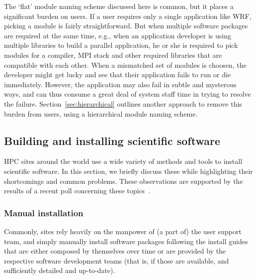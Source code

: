 The `flat' module naming scheme discussed here is common, but it places a significant
burden on users. If a user requires only a single application like WRF, picking a
module is fairly straightforward. But when multiple software packages are required
at the same time, e.g., when an application developer is using multiple libraries to
build a parallel application, he or she is required to pick modules for a
compiler, MPI stack and other required libraries that are compatible with each other.
When a mismatched set of modules is choosen, the developer might get lucky and
see that their application fails to run or die immediately.  However, the
application may also fail in subtle and mysterous ways, and can thus consume a
great deal of system staff time in trying to resolve the failure.
Section~\ref{sec:hierarchical} outlines another approach to remove this burden
from users, using a hierarchical module naming scheme.


%
%


\subsection{Building and installing scientific software}
\label{sec:installing}

HPC sites around the world use a wide variety of methods and tools to
install scientific software. In this section, we briefly discuss these while
highlighting their shortcomings and common problems. These observations are
supported by the results of a recent poll concerning these
topics~\cite{ISC14bof}.

\subsubsection{Manual installation}

Commonly, sites rely heavily on the manpower of (a part of)
the user support team, and simply manually install software packages following
the install guides that are either composed by themselves over time or are provided
by the respective software development teams (that is, if those are available, and
sufficiently detailed and up-to-date).

